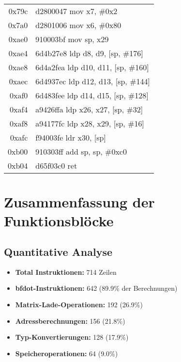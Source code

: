 \documentclass[11pt,a4paper]{article}
\begin{document}
\begin{longtable}{|r|l|}
\rowcolor{remainder} 0x79c & d2800047 \quad mov x7, \#0x2 \\
\rowcolor{remainder} 0x7a0 & d2801006 \quad mov x6, \#0x80 \\


\rowcolor{epilogue} 0xae0 & 910003bf \quad mov sp, x29 \\
\rowcolor{epilogue} 0xae4 & 6d4b27e8 \quad ldp d8, d9, [sp, \#176] \\
\rowcolor{epilogue} 0xae8 & 6d4a2fea \quad ldp d10, d11, [sp, \#160] \\
\rowcolor{epilogue} 0xaec & 6d4937ec \quad ldp d12, d13, [sp, \#144] \\
\rowcolor{epilogue} 0xaf0 & 6d483fee \quad ldp d14, d15, [sp, \#128] \\
\rowcolor{epilogue} 0xaf4 & a9426ffa \quad ldp x26, x27, [sp, \#32] \\
\rowcolor{epilogue} 0xaf8 & a94177fc \quad ldp x28, x29, [sp, \#16] \\
\rowcolor{epilogue} 0xafc & f94003fe \quad ldr x30, [sp] \\
\rowcolor{epilogue} 0xb00 & 910303ff \quad add sp, sp, \#0xc0 \\
\rowcolor{epilogue} 0xb04 & d65f03c0 \quad ret \\

\hline
\end{longtable}

\section{Zusammenfassung der Funktionsblöcke}

\subsection{Quantitative Analyse}
\begin{itemize}
\item \textbf{Total Instruktionen:} 714 Zeilen
\item \textbf{bfdot-Instruktionen:} 642 (89.9\% der Berechnungen)
\item \textbf{Matrix-Lade-Operationen:} 192 (26.9\%)
\item \textbf{Adressberechnungen:} 156 (21.8\%)
\item \textbf{Typ-Konvertierungen:} 128 (17.9\%)
\item \textbf{Speicheroperationen:} 64 (9.0\%)
\end{itemize}
\end{document}
